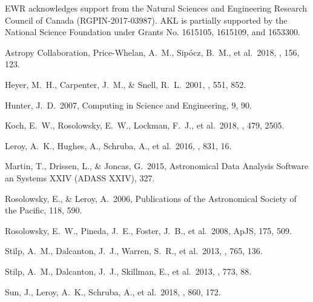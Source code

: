 \documentclass{rnaastex}
\begin{document}
\acknowledgments

EWR acknowledges support from the Natural Sciences and Engineering Research Council of Canada (RGPIN-2017-03987). AKL is partially supported by the National Science Foundation under Grants No. 1615105, 1615109, and 1653300.


\begin{thebibliography}{}

 Astropy Collaboration, Price-Whelan, A.~M., Sip{\'{o}}cz, B.~M., et al.\ 2018, \aj, 156, 123.

 Heyer, M.~H., Carpenter, J.~M., \& Snell, R.~L.\ 2001, \apj, 551, 852.

 Hunter, J.~D.\ 2007, Computing in Science and Engineering, 9, 90.

 Koch, E.~W., Rosolowsky, E.~W., Lockman, F.~J., et al.\ 2018, \mnras, 479, 2505.

 Leroy, A.~K., Hughes, A., Schruba, A., et al.\ 2016, \apj, 831, 16.

 Martin, T., Drissen, L., \& Joncas, G.\ 2015, Astronomical Data Analysis Software an Systems XXIV (ADASS XXIV), 327.

 Rosolowsky, E., \& Leroy, A.\ 2006, Publications of the Astronomical Society of the Pacific, 118, 590.

 Rosolowsky, E.~W., Pineda, J.~E., Foster, J.~B., et al.\ 2008, ApJS, 175, 509.

 Stilp, A.~M., Dalcanton, J.~J., Warren, S.~R., et al.\ 2013, \apj, 765, 136.

 Stilp, A.~M., Dalcanton, J.~J., Skillman, E., et al.\ 2013, \apj, 773, 88.

 Sun, J., Leroy, A.~K., Schruba, A., et al.\ 2018, \apj, 860, 172.


\end{thebibliography}
\end{document}
